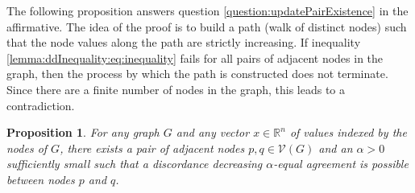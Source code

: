 \documentclass{article}
\newtheorem{proposition}{Proposition}
\theoremstyle{remark}
\newcommand{\R}[0]{\mathbb{R}}
\begin{document}
The following proposition answers question \ref{question:updatePairExistence} in the affirmative. The idea of the proof is to build a path (walk of distinct nodes) such that the node values along the path are strictly increasing. If inequality \eqref{lemma:ddInequality:eq:inequality} fails for all pairs of adjacent nodes in the graph, then the process by which the path is constructed does not terminate. Since there are a finite number of nodes in the graph, this leads to a contradiction.   
\begin{proposition}{\label{prop:updatePairExistence}}
	For any graph $G$ and any vector $x\in\R^n$ of values indexed by the nodes of $G$, there exists a pair of adjacent nodes $p,q\in\mathcal{V}(G)$ and an $\alpha>0$ sufficiently small such that a discordance decreasing $\alpha$-equal agreement is possible between nodes $p$ and $q$.
\end{proposition}
\end{document}
